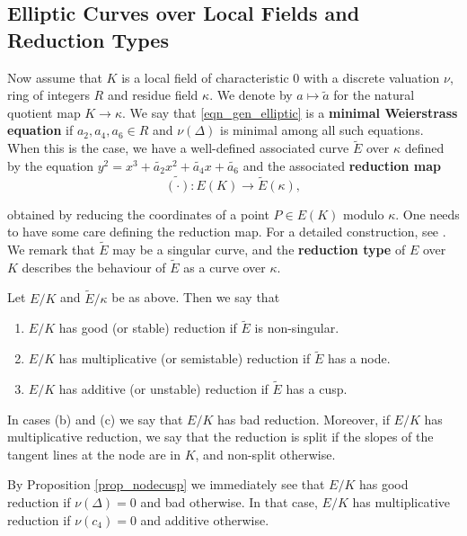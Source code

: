 \subsection{Elliptic Curves over Local Fields and Reduction Types}

Now assume that $K$ is a local field of characteristic $0$ with a discrete valuation $\nu$, ring of integers $R$ and residue field $\kappa$. We denote by $a\mapsto \tilde{a}$ for the natural quotient map $K\to\kappa$. We say that \eqref{eqn_gen_elliptic} is a \textbf{minimal Weierstrass equation} if $a_2,a_4,a_6\in R$ and $\nu(\Delta)$ is minimal among all such equations. When this is the case, we have a well-defined associated curve $\tilde{E}$ over $\kappa$ defined by the equation $y^2=x^3+\tilde{a_2}x^2+\tilde{a_4}x+\tilde{a_6}$ and the associated \textbf{reduction map}
\begin{equation}\label{eqn_reduction}
    \widetilde{(\cdot)}:E(K)\longrightarrow \tilde{E}(\kappa),
\end{equation}

obtained by reducing the coordinates of a point $P\in E(K)$ modulo $\kappa$. One needs to have some care defining the reduction map. For a detailed construction, see \cite[\S1 VII.2]{S1}. We remark that $\tilde{E}$ may be a singular curve, and the \textbf{reduction type} of $E$ over $K$ describes the behaviour of $\tilde{E}$ as a curve over $\kappa$.

\begin{defn}
    Let $E/K$ and $\tilde{E}/\kappa$ be as above. Then we say that 
    \begin{enumerate}[label={(\alph*)}]
        \item $E/K$ has good (or stable) reduction if $\tilde{E}$ is non-singular.
        \item $E/K$ has multiplicative (or semistable) reduction if $\tilde{E}$ has a node.
        \item $E/K$ has additive (or unstable) reduction if $\tilde{E}$ has a cusp.
    \end{enumerate}
    In cases (b) and (c) we say that $E/K$ has bad reduction. Moreover, if $E/K$ has multiplicative reduction, we say that the reduction is split if the slopes of the tangent lines at the node are in $K$, and non-split otherwise.
\end{defn}

By Proposition \ref*{prop_nodecusp} we immediately see that $E/K$ has good reduction if $\nu(\Delta)=0$ and bad otherwise. In that case, $E/K$ has multiplicative reduction if $\nu(c_4)=0$ and additive otherwise.

